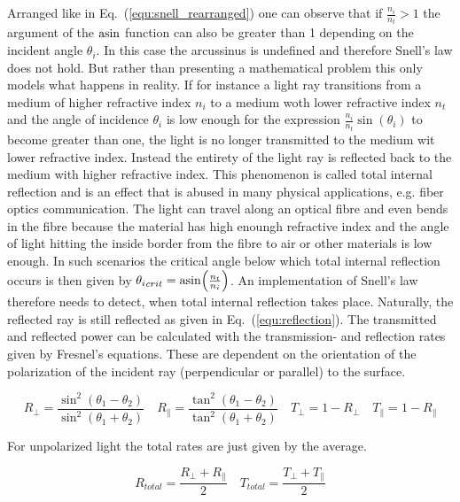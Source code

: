 \documentclass[a4paper,10pt]{article}
\newcommand{\equref}[1]{Eq.~(\ref{#1})}
\begin{document}
    Arranged like in \equref{equ:snell_rearranged} one can observe
    that if $\frac{n_i}{n_t} > 1$ the argument of the $\asin$ function
    can also be greater than 1 depending on the incident angle
    $\theta_i$.
    In this case the arcussinus is undefined and therefore Snell's 
    law does not hold.
    But rather than presenting a mathematical problem this only
    models what happens in reality.
    If for instance a light ray transitions from a medium of higher
    refractive index $n_i$ to a medium woth lower refractive index
    $n_t$ and the angle of incidence $\theta_i$ is low enough
    for the expression $\frac{n_i}{n_t} \sin(\theta_i)$ to become
    greater than one, the light is no longer transmitted to the 
    medium wit lower refractive index.
    Instead the entirety of the light ray is reflected back to the
    medium with higher refractive index.
    This phenomenon is called total internal reflection and is an 
    effect that is abused in many physical applications, e.g.
    fiber optics communication.
    The light can travel along an optical fibre and even bends in the fibre
    because the material has high enoungh refractive index and the angle
    of light hitting the inside border from the fibre to air or other
    materials is low enough.
    In such scenarios the critical angle below which total internal reflection occurs is
    then given by ${\theta_i}_{crit} = \asin(\frac{n_t}{n_i})$. 
    An implementation of Snell's law therefore needs to detect, when
    total internal reflection takes place.
    Naturally, the reflected ray is still reflected as given in
    \equref{equ:reflection}.
    The transmitted and reflected power can be calculated with the transmission- and
    reflection rates given by Fresnel's equations.
    These are dependent on the orientation of the polarization of the incident ray
    (perpendicular or parallel) to the surface.

    \begin{equation}
        \label{equ:fresnel}
		R_{\perp} = \frac{\sin^2(\theta_1 - \theta_2)}{\sin^2(\theta_1 + \theta_2)} \quad
		R_{\parallel} = \frac{\tan^2(\theta_1 - \theta_2)}{\tan^2(\theta_1 + \theta_2)} \quad
		T_{\perp} = 1 - R_{\perp} \quad
		T_{\parallel} = 1 - R_{\parallel}
    \end{equation}

    For unpolarized light the total rates are just given by the average.
    
    \begin{equation}
        \label{equ:fresnel_unpolarized}
		R_{total} = \frac{R_{\perp} + R_{\parallel}}{2} \quad
		T_{total} = \frac{T_{\perp} + T_{\parallel}}{2}
    \end{equation}
    
\end{document}
